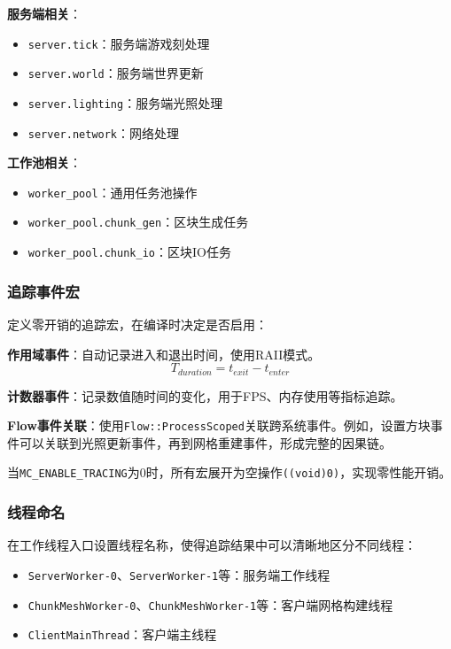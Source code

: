\textbf{服务端相关}：
\begin{itemize}
    \item \texttt{server.tick}：服务端游戏刻处理
    \item \texttt{server.world}：服务端世界更新
    \item \texttt{server.lighting}：服务端光照处理
    \item \texttt{server.network}：网络处理
\end{itemize}

\textbf{工作池相关}：
\begin{itemize}
    \item \texttt{worker\_pool}：通用任务池操作
    \item \texttt{worker\_pool.chunk\_gen}：区块生成任务
    \item \texttt{worker\_pool.chunk\_io}：区块IO任务
\end{itemize}

\subsubsection{追踪事件宏}

定义零开销的追踪宏，在编译时决定是否启用：

\textbf{作用域事件}：自动记录进入和退出时间，使用RAII模式。
\begin{equation}
T_{duration} = t_{exit} - t_{enter}
\end{equation}

\textbf{计数器事件}：记录数值随时间的变化，用于FPS、内存使用等指标追踪。

\textbf{Flow事件关联}：使用\texttt{Flow::ProcessScoped}关联跨系统事件。例如，设置方块事件可以关联到光照更新事件，再到网格重建事件，形成完整的因果链。

当\texttt{MC\_ENABLE\_TRACING}为0时，所有宏展开为空操作\texttt{((void)0)}，实现零性能开销。

\subsubsection{线程命名}

在工作线程入口设置线程名称，使得追踪结果中可以清晰地区分不同线程：
\begin{itemize}
    \item \texttt{ServerWorker-0}、\texttt{ServerWorker-1}等：服务端工作线程
    \item \texttt{ChunkMeshWorker-0}、\texttt{ChunkMeshWorker-1}等：客户端网格构建线程
    \item \texttt{ClientMainThread}：客户端主线程
\end{itemize}

